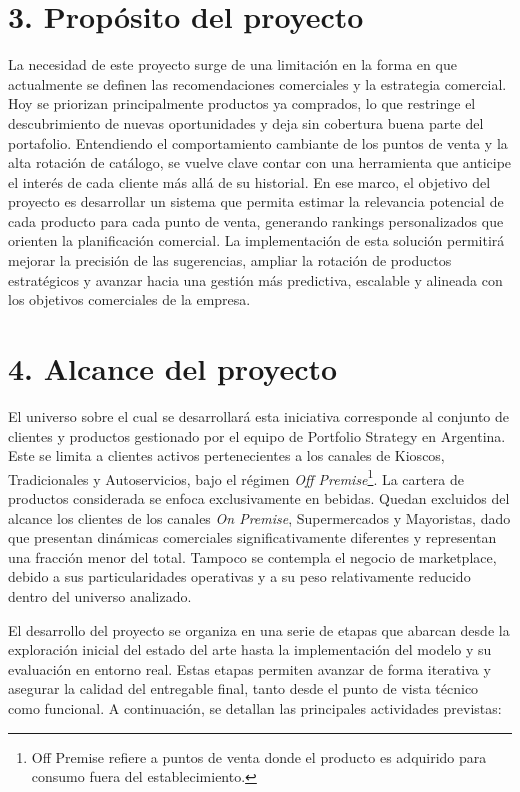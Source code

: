 \documentclass[
11pt, %
]{charter}
\begin{document}
\section{3. Propósito del proyecto}
\label{sec:proposito}

La necesidad de este proyecto surge de una limitación en la forma en que actualmente se definen las recomendaciones comerciales y la estrategia comercial. Hoy se priorizan principalmente productos ya comprados, lo que restringe el descubrimiento de nuevas oportunidades y deja sin cobertura buena parte del portafolio. Entendiendo el comportamiento cambiante de los puntos de venta y la alta rotación de catálogo, se vuelve clave contar con una herramienta que anticipe el interés de cada cliente más allá de su historial.  
En ese marco, el objetivo del proyecto es desarrollar un sistema que permita estimar la relevancia potencial de cada producto para cada punto de venta, generando rankings personalizados que orienten la planificación comercial. La implementación de esta solución permitirá mejorar la precisión de las sugerencias, ampliar la rotación de productos estratégicos y avanzar hacia una gestión más predictiva, escalable y alineada con los objetivos comerciales de la empresa.

\section{4. Alcance del proyecto}
\label{sec:alcance}

El universo sobre el cual se desarrollará esta iniciativa corresponde al conjunto de clientes y productos gestionado por el equipo de Portfolio Strategy en Argentina. Este se limita a clientes activos pertenecientes a los canales de Kioscos, Tradicionales y Autoservicios, bajo el régimen \textit{Off Premise}\footnote{Off Premise refiere a puntos de venta donde el producto es adquirido para consumo fuera del establecimiento.}. La cartera de productos considerada se enfoca exclusivamente en bebidas. Quedan excluidos del alcance los clientes de los canales \textit{On Premise}, Supermercados y Mayoristas, dado que presentan dinámicas comerciales significativamente diferentes y representan una fracción menor del total. Tampoco se contempla el negocio de marketplace, debido a sus particularidades operativas y a su peso relativamente reducido dentro del universo analizado.

El desarrollo del proyecto se organiza en una serie de etapas que abarcan desde la exploración inicial del estado del arte hasta la implementación del modelo y su evaluación en entorno real. Estas etapas permiten avanzar de forma iterativa y asegurar la calidad del entregable final, tanto desde el punto de vista técnico como funcional. A continuación, se detallan las principales actividades previstas:
\end{document}
